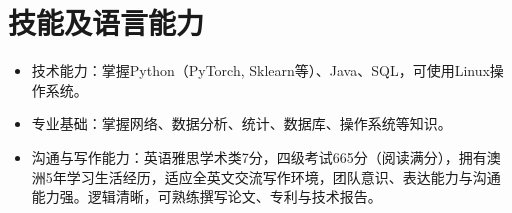 \documentclass[UTF8,letterpaper,11pt]{article}
\begin{document}

\section{\textbf{技能及语言能力}}

\begin{itemize}
  \setlength\itemsep{1.8pt}
  \item 技术能力：掌握Python（PyTorch, Sklearn等）、Java、SQL，可使用Linux操作系统。
  \item 专业基础：掌握网络、数据分析、统计、数据库、操作系统等知识。
  \item 沟通与写作能力：英语雅思学术类7分，四级考试665分（阅读满分），拥有澳洲5年学习生活经历，适应全英文交流写作环境，团队意识、表达能力与沟通能力强。逻辑清晰，可熟练撰写论文、专利与技术报告。
\end{itemize}


\end{document}
